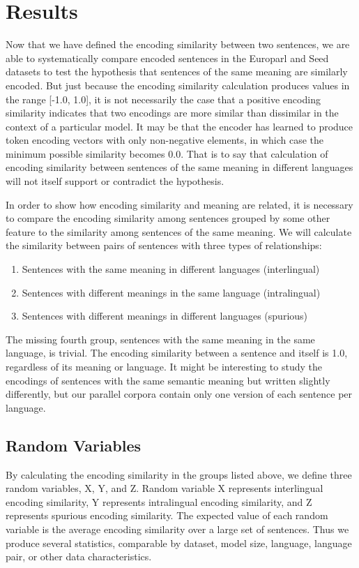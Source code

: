 

\chapter{Results}
\label{chap:results}

Now that we have defined the encoding similarity between two sentences, we are able to systematically compare encoded sentences in the Europarl and Seed datasets to test the hypothesis that sentences of the same meaning are similarly encoded. But just because the encoding similarity calculation produces values in the range [-1.0, 1.0], it is not necessarily the case that a positive encoding similarity indicates that two encodings are more similar than dissimilar in the context of a particular model. It may be that the encoder has learned to produce token encoding vectors with only non-negative elements, in which case the minimum possible similarity becomes 0.0. That is to say that calculation of encoding similarity between sentences of the same meaning in different languages will not itself support or contradict the hypothesis. 

In order to show how encoding similarity and meaning are related, it is necessary to compare the encoding similarity among sentences grouped by some other feature to the similarity among sentences of the same meaning. We will calculate the similarity between pairs of sentences with three types of relationships:

\begin{enumerate}
  \item Sentences with the same meaning in different languages (interlingual)
  \item Sentences with different meanings in the same language (intralingual)
  \item Sentences with different meanings in different languages (spurious)
\end{enumerate}

The missing fourth group, sentences with the same meaning in the same language, is trivial. The encoding similarity between a sentence and itself is 1.0, regardless of its meaning or language. It might be interesting to study the encodings of sentences with the same semantic meaning but written slightly differently, but our parallel corpora contain only one version of each sentence per language.

\section{Random Variables}
By calculating the encoding similarity in the groups listed above, we define three random variables, X, Y, and Z. Random variable X represents interlingual encoding similarity, Y represents intralingual encoding similarity, and Z represents spurious encoding similarity. The expected value of each random variable is the average encoding similarity over a large set of sentences. Thus we produce several statistics, comparable by dataset, model size, language, language pair, or other data characteristics. 

